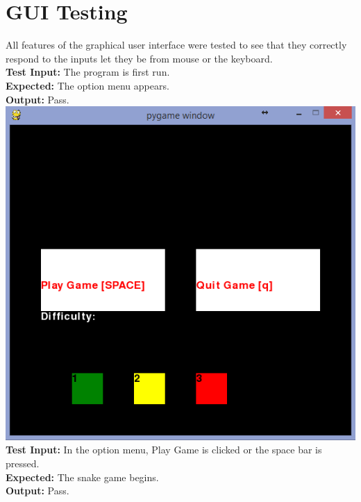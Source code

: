 \documentclass[12pt]{article}
\begin{document}
\section{GUI Testing}

All features of the graphical user interface were tested to see that they correctly respond to the inputs let they be from mouse or the keyboard. 
\\
\textbf{Test Input:} The program is first run.\\
\textbf{Expected:} The option menu appears.\\
\textbf{Output:} Pass.\\
\pagebreak
\includegraphics[width=\textwidth]{startmenu.png}\\
\textbf{Test Input:} In the option menu, Play Game is clicked or the space bar is pressed.\\
\textbf{Expected:} The snake game begins.\\
\textbf{Output:} Pass.\\
\pagebreak
\end{document}
